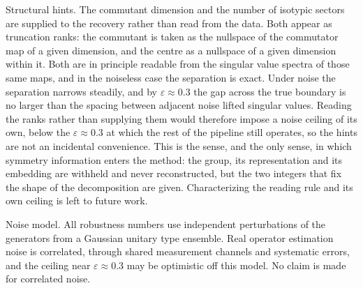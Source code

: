 \documentclass[11pt]{article}
\begin{document}
Structural hints. The commutant dimension and the number of isotypic sectors are
supplied to the recovery rather than read from the data. Both appear as
truncation ranks: the commutant is taken as the nullspace of the commutator map
of a given dimension, and the centre as a nullspace of a given dimension within
it. Both are in principle readable from the singular value spectra of those same
maps, and in the noiseless case the separation is exact. Under noise the separation narrows steadily, and by $\varepsilon\approx0.3$ the
gap across the true boundary is no larger than the spacing between adjacent
noise lifted singular values. Reading the ranks rather than supplying
them would therefore impose a noise ceiling of its own, below the
$\varepsilon\approx0.3$ at which the rest of the pipeline still operates, so the
hints are not an incidental convenience. This is the sense, and the only sense,
in which symmetry information enters the method: the group, its representation
and its embedding are withheld and never reconstructed, but the two integers that
fix the shape of the decomposition are given. Characterizing the reading rule and
its own ceiling is left to future work.

Noise model. All robustness numbers use independent perturbations of the
generators from a Gaussian unitary type ensemble. Real operator estimation noise
is correlated, through shared measurement channels and systematic errors, and the
ceiling near $\varepsilon\approx0.3$ may be optimistic off this model. No claim is
made for correlated noise.
\end{document}
